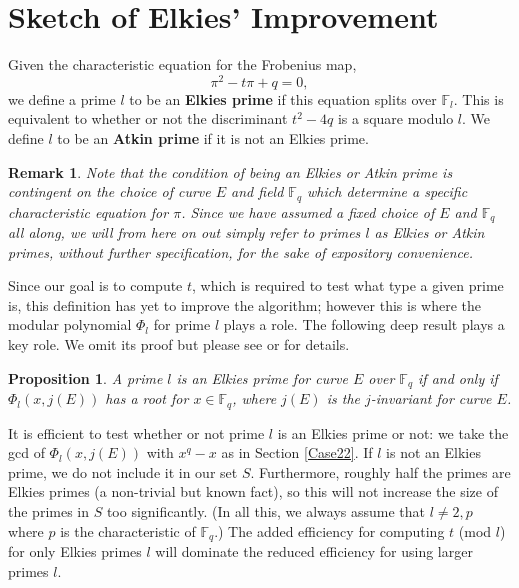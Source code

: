 \documentclass{article}
\newtheorem{Prop}{Proposition}
\newtheorem{Rem}{Remark}
\newcommand{\f}{\mathbb{F}}
\begin{document}


\section{Sketch of Elkies' Improvement}

Given the characteristic equation for the Frobenius map, $$\pi^2 -
t\pi + q = 0,$$ we define a prime $l$ to be an {\bf Elkies prime} if
this equation splits over $\f_l$.  This is equivalent to whether or
not the discriminant $t^2-4q$ is a square modulo $l$.  We define $l$
to be an {\bf Atkin prime} if it is not an Elkies prime.

\begin{Rem} Note that the condition of being an Elkies or Atkin prime is
contingent on the choice of curve $E$ and field $\f_q$ which
determine a specific characteristic equation for $\pi$.  Since we
have assumed a fixed choice of $E$ and $\f_q$ all along, we will
from here on out simply refer to primes $l$ as Elkies or Atkin
primes, without further specification, for the sake of expository
convenience.
\end{Rem}

Since our goal is to compute $t$, which is required to test what
type a given prime is, this definition has yet to improve the
algorithm; however this is where the modular polynomial $\Phi_l$ for
prime $l$ plays a role.  The following deep result plays a key role.
We omit its proof but please see \cite{Blake} or \cite{Dewaghe} for
details.

\begin{Prop}
A prime $l$ is an Elkies prime for curve $E$ over $\f_q$ if and only if $\Phi_l(x,j(E))$ has a root
for $x \in \f_q$, where $j(E)$ is the $j$-invariant for curve $E$.
\end{Prop}

It is efficient to test whether or not prime $l$ is an Elkies prime
or not: we take the gcd of $\Phi_l(x,j(E))$ with $x^q-x$ as in
Section \ref{Case22}.  If $l$ is not an Elkies prime, we do not
include it in our set $S$. Furthermore, roughly half the primes are
Elkies primes (a non-trivial but known fact), so this will not
increase the size of the primes in $S$ too significantly.  (In all
this, we always assume that $l \not = 2, p$ where $p$ is the
characteristic of $\f_q$.)  The added efficiency for computing $t$
(mod $l$) for only Elkies primes $l$ will dominate the reduced
efficiency for using larger primes $l$.
\end{document}
